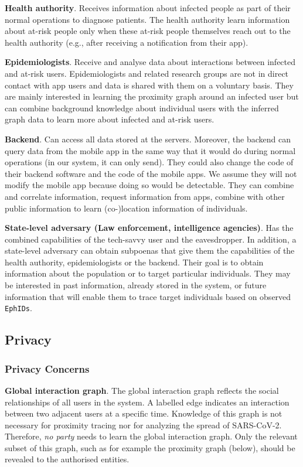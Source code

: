 \documentclass[12pt,a4paper]{article}
\begin{document}
\textbf{Health authority}. Receives information about infected people as part of their normal operations to diagnose patients. The health authority learn information about at-risk people only when these at-risk people themselves reach out to the health authority (e.g., after receiving a notification from their app).

\textbf{Epidemiologists}. Receive and analyse data about interactions between infected and at-risk users. Epidemiologists and related research groups are not in direct contact with app users and data is shared with them on a voluntary basis. They are mainly interested in learning the proximity graph around an infected user but can combine background knowledge about individual users with the inferred graph data to learn more about infected and at-risk users.

\textbf{Backend}. Can access all data stored at the servers. Moreover, the backend can query data from the mobile app in the same way that it would do during normal operations (in our system, it can only send). They could also change the code of their backend software and the code of the mobile apps. We assume they will not modify the mobile app because doing so would be detectable. They can combine and correlate information, request information from apps, combine with other public information to learn (co-)location information of individuals.

\textbf{State-level adversary (Law enforcement, intelligence agencies)}. Has the combined
capabilities of the tech-savvy user and the eavesdropper. In addition, a state-level adversary can obtain subpoenas that give them the capabilities of the health authority, epidemiologists or the backend. Their goal is to obtain information about the population or to target particular individuals. They may be interested in past information, already stored in the system, or future information that will enable them to trace target individuals based on observed \texttt{EphIDs}.
\subsection*{Privacy}
\subsubsection*{Privacy Concerns}
\textbf{Global interaction graph}. The global interaction graph reflects the social relationships of all users in the system. A labelled edge indicates an interaction between two adjacent users at a specific time. Knowledge of this graph is not necessary for proximity tracing nor for analyzing the spread of SARS-CoV-2. Therefore, \textit{no party} needs to learn the global interaction graph. Only the relevant subset of this graph, such as for example the proximity graph (below), should be revealed to the authorised entities.
\end{document}
